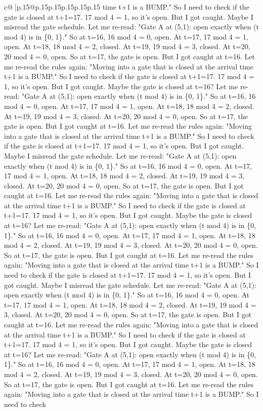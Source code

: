\documentclass{article}
\begin{document}
{\begin{supertabular}{c@{$\;$}|p{.15\linewidth}@{}p{.15\linewidth}p{.15\linewidth}p{.15\linewidth}p{.15\linewidth}p{.15\linewidth}}
{{{time t+1 is a BUMP." So I need to check if the gate is closed at t+1=17. 17 mod 4 = 1, so it's open. But I got caught. Maybe I misread the gate schedule. Let me re{-}read: "Gate A at (5,1): open exactly when (t mod 4) is in \{0, 1\}." So at t=16, 16 mod 4 = 0, open. At t=17, 17 mod 4 = 1, open. At t=18, 18 mod 4 = 2, closed. At t=19, 19 mod 4 = 3, closed. At t=20, 20 mod 4 = 0, open. So at t=17, the gate is open. But I got caught at t=16. Let me re{-}read the rules again: "Moving into a gate that is closed at the arrival time t+1 is a BUMP." So I need to check if the gate is closed at t+1=17. 17 mod 4 = 1, so it's open. But I got caught. Maybe the gate is closed at t=16? Let me re{-}read: "Gate A at (5,1): open exactly when (t mod 4) is in \{0, 1\}." So at t=16, 16 mod 4 = 0, open. At t=17, 17 mod 4 = 1, open. At t=18, 18 mod 4 = 2, closed. At t=19, 19 mod 4 = 3, closed. At t=20, 20 mod 4 = 0, open. So at t=17, the gate is open. But I got caught at t=16. Let me re{-}read the rules again: "Moving into a gate that is closed at the arrival time t+1 is a BUMP." So I need to check if the gate is closed at t+1=17. 17 mod 4 = 1, so it's open. But I got caught. Maybe I misread the gate schedule. Let me re{-}read: "Gate A at (5,1): open exactly when (t mod 4) is in \{0, 1\}." So at t=16, 16 mod 4 = 0, open. At t=17, 17 mod 4 = 1, open. At t=18, 18 mod 4 = 2, closed. At t=19, 19 mod 4 = 3, closed. At t=20, 20 mod 4 = 0, open. So at t=17, the gate is open. But I got caught at t=16. Let me re{-}read the rules again: "Moving into a gate that is closed at the arrival time t+1 is a BUMP." So I need to check if the gate is closed at t+1=17. 17 mod 4 = 1, so it's open. But I got caught. Maybe the gate is closed at t=16? Let me re{-}read: "Gate A at (5,1): open exactly when (t mod 4) is in \{0, 1\}." So at t=16, 16 mod 4 = 0, open. At t=17, 17 mod 4 = 1, open. At t=18, 18 mod 4 = 2, closed. At t=19, 19 mod 4 = 3, closed. At t=20, 20 mod 4 = 0, open. So at t=17, the gate is open. But I got caught at t=16. Let me re{-}read the rules again: "Moving into a gate that is closed at the arrival time t+1 is a BUMP." So I need to check if the gate is closed at t+1=17. 17 mod 4 = 1, so it's open. But I got caught. Maybe I misread the gate schedule. Let me re{-}read: "Gate A at (5,1): open exactly when (t mod 4) is in \{0, 1\}." So at t=16, 16 mod 4 = 0, open. At t=17, 17 mod 4 = 1, open. At t=18, 18 mod 4 = 2, closed. At t=19, 19 mod 4 = 3, closed. At t=20, 20 mod 4 = 0, open. So at t=17, the gate is open. But I got caught at t=16. Let me re{-}read the rules again: "Moving into a gate that is closed at the arrival time t+1 is a BUMP." So I need to check if the gate is closed at t+1=17. 17 mod 4 = 1, so it's open. But I got caught. Maybe the gate is closed at t=16? Let me re{-}read: "Gate A at (5,1): open exactly when (t mod 4) is in \{0, 1\}." So at t=16, 16 mod 4 = 0, open. At t=17, 17 mod 4 = 1, open. At t=18, 18 mod 4 = 2, closed. At t=19, 19 mod 4 = 3, closed. At t=20, 20 mod 4 = 0, open. So at t=17, the gate is open. But I got caught at t=16. Let me re{-}read the rules again: "Moving into a gate that is closed at the arrival time t+1 is a BUMP." So I need to check }}}
\end{supertabular}}
\end{document}
